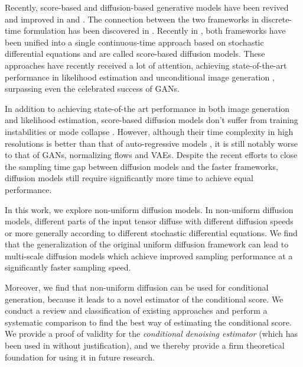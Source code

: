Recently, score-based \cite{hyvarinen2005score_original} and diffusion-based  \cite{sohldickstein2015diffusion_original} generative models have been revived and improved in \cite{song2020generative_score} and \cite{ho2020denoising}.  
The connection between the two frameworks in discrete-time formulation has been discovered in \cite{vincent2011connection}. 
Recently in \cite{song2021sde}, both frameworks have been unified into a single continuous-time approach based on stochastic differential equations \cite{song2021sde} and are called score-based diffusion models. 
These approaches have recently received a lot of attention, achieving state-of-the-art performance in likelihood estimation \cite{song2021sde} and unconditional image generation \cite{dhariwal2021diffusion_beats_gans}, surpassing even the celebrated success of GANs.

In addition to achieving state-of-the art performance in both image generation and likelihood estimation, score-based diffusion models don't suffer from training instabilities or mode collapse \cite{dhariwal2021diffusion_beats_gans, song2021sde}. However, although their time complexity in high resolutions is better than that of auto-regressive models \cite{dhariwal2021diffusion_beats_gans}, it is still notably worse to that of GANs, normalizing flows and VAEs. Despite the recent efforts to close the sampling time gap between diffusion models and the faster frameworks, diffusion models still require significantly more time to achieve equal performance.

In this work, we explore non-uniform diffusion models. In non-uniform diffusion models, different parts of the input tensor diffuse with different diffusion speeds or more generally according to different stochastic differential equations. We find that the generalization of the original uniform diffusion framework can lead to multi-scale diffusion models which achieve improved sampling performance at a significantly faster sampling speed.

Moreover, we find that non-uniform diffusion can be used for conditional generation, because it leads to a novel estimator of the conditional score. We conduct a review and classification of existing approaches and perform a systematic comparison to find the best way of estimating the conditional score. We provide a proof of validity for the \textit{conditional denoising estimator} (which has been used in \cite{saharia2021sr3,tashiro2021csdi} without justification), and we thereby provide a firm theoretical foundation for using it in future research.

